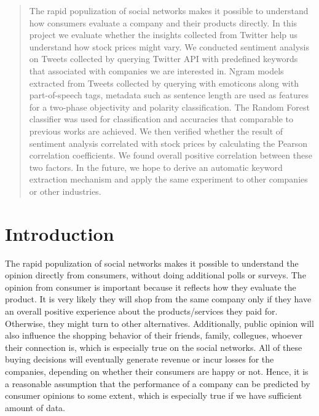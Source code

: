 \documentclass[12pt]{article}
\begin{document}
\maketitle



\begin{abstract}
The rapid populization of social networks makes it possible to understand how consumers evaluate a company and their products directly. In this project we evaluate whether the insights collected from Twitter help us understand how stock prices might vary. We conducted sentiment analysis on Tweets collected by querying Twitter API with predefined keywords that associated with companies we are interested in. Ngram models extracted from Tweets collected by querying with emoticons along with part-of-speech tags, metadata such as sentence length are used as features for a two-phase objectivity and polarity classification. The Random Forest classifier was used for classification and accuracies that comparable to previous works are achieved. We then verified whether the result of sentiment analysis correlated with stock prices by calculating the Pearson correlation coefficients. We found overall positive correlation between these two factors. In the future, we hope to derive an automatic keyword extraction mechanism and apply the same experiment to other companies or other industries.
\end{abstract}

\section{Introduction}
The rapid populization of social networks makes it possible to understand the opinion directly from consumers, without doing additional polls or surveys. The opinion from consumer is important because it reflects how they evaluate the product. It is very likely they will shop from the same company only if they have an overall positive experience about the products/services they paid for. Otherwise, they might turn to other alternatives. Additionally, public opinion will also influence the shopping behavior of their friends, family, collegues, whoever their connection is, which is especially true on the social networks. All of these buying decisions will eventually generate revenue or incur losses for the companies, depending on whether their consumers are happy or not. Hence, it is a reasonable assumption that the performance of a company can be predicted by consumer opinions to some extent, which is especially true if we have sufficient amount of data. 
\end{document}
